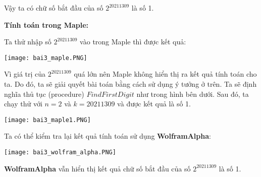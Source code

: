 Vậy ta có chữ số bắt đầu của số $2^{20211309}$ là số 1.

\textbf{Tính toán trong Maple:}

Ta thử nhập số $2^{20211309}$ vào trong Maple thì được kết quả:

\texttt{[image: bai3\_maple.PNG]}

Vì giá trị của $2^{20211309}$ quá lớn nên Maple không hiển thị ra kết quả tính toán cho ta. Do đó, ta sẽ giải quyết bài toán bằng cách sử dụng ý tưởng ở trên. Ta sẽ định nghĩa thủ tục (procedure) $FindFirstDigit$ như trong hình bên dưới. Sau đó, ta chạy thử với $n = 2$ và $k = 20211309$ và được kết quả là số 1.

\texttt{[image: bai3\_maple1.PNG]}

Ta có thể kiểm tra lại kết quả tính toán sử dụng \textbf{WolframAlpha}:

\texttt{[image: bai3\_wolfram\_alpha.PNG]}

\textbf{WolframAlpha} vẫn hiển thị kết quả chữ số bắt đầu của số $2^{20211309}$ là số 1.
	
\clearpage